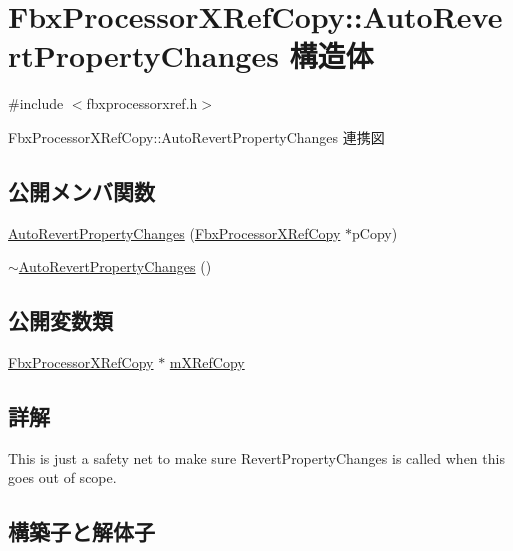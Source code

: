 \hypertarget{struct_fbx_processor_x_ref_copy_1_1_auto_revert_property_changes}{}\section{Fbx\+Processor\+X\+Ref\+Copy\+:\+:Auto\+Revert\+Property\+Changes 構造体}
\label{struct_fbx_processor_x_ref_copy_1_1_auto_revert_property_changes}


{\ttfamily \#include $<$fbxprocessorxref.\+h$>$}



Fbx\+Processor\+X\+Ref\+Copy\+:\+:Auto\+Revert\+Property\+Changes 連携図
\subsection*{公開メンバ関数}
\begin{DoxyCompactItemize}
\item 
\hyperlink{struct_fbx_processor_x_ref_copy_1_1_auto_revert_property_changes_a1fa531d7bd5f1c01dca29037e603eb1e}{Auto\+Revert\+Property\+Changes} (\hyperlink{class_fbx_processor_x_ref_copy}{Fbx\+Processor\+X\+Ref\+Copy} $\ast$p\+Copy)
\item 
\hyperlink{struct_fbx_processor_x_ref_copy_1_1_auto_revert_property_changes_a1ab425cf2d1b2a467367492ff5bff062}{$\sim$\+Auto\+Revert\+Property\+Changes} ()
\end{DoxyCompactItemize}
\subsection*{公開変数類}
\begin{DoxyCompactItemize}
\item 
\hyperlink{class_fbx_processor_x_ref_copy}{Fbx\+Processor\+X\+Ref\+Copy} $\ast$ \hyperlink{struct_fbx_processor_x_ref_copy_1_1_auto_revert_property_changes_a7a3b1268b589b017662d0830f14dfe2c}{m\+X\+Ref\+Copy}
\end{DoxyCompactItemize}


\subsection{詳解}
This is just a safety net to make sure Revert\+Property\+Changes is called when this goes out of scope. 

\subsection{構築子と解体子}
\mbox{\label{struct_fbx_processor_x_ref_copy_1_1_auto_revert_property_changes_a1fa531d7bd5f1c01dca29037e603eb1e}} 

